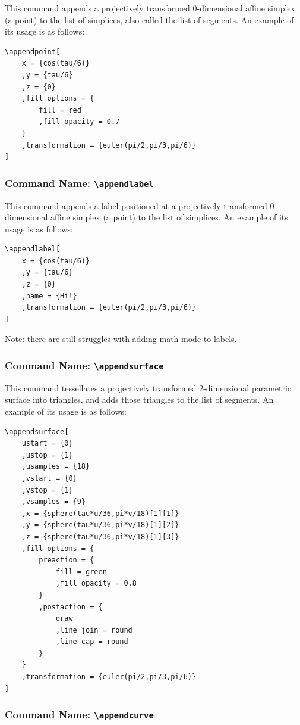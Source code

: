 This command appends a projectively transformed \(0\)-dimensional 
affine simplex (a point) to the list of simplices, also called the 
list of segments. An example of its usage is as follows:
\begin{verbatim}
\appendpoint[
    x = {cos(tau/6)}
    ,y = {tau/6}
    ,z = {0}
    ,fill options = {
        fill = red
        ,fill opacity = 0.7
    }
    ,transformation = {euler(pi/2,pi/3,pi/6)}
]
\end{verbatim}

\subsubsection{Command Name: \texttt{\textbackslash appendlabel}}
This command appends a label positioned at a projectively 
transformed \(0\)-dimensional affine simplex (a point) to the list 
of simplices. An example of its usage is as follows:
\begin{verbatim}
\appendlabel[
    x = {cos(tau/6)}
    ,y = {tau/6}
    ,z = {0}
    ,name = {Hi!}
    ,transformation = {euler(pi/2,pi/3,pi/6)}
]
\end{verbatim}
Note: there are still struggles with adding math mode to labels.

\subsubsection{Command Name: \texttt{\textbackslash appendsurface}}

This command tessellates a projectively transformed \(2\)-dimensional 
parametric surface into triangles, and adds those triangles to the 
list of segments. An example of its usage is as follows:
\begin{verbatim}
\appendsurface[
    ustart = {0}
    ,ustop = {1}
    ,usamples = {18}
    ,vstart = {0}
    ,vstop = {1}
    ,vsamples = {9}
    ,x = {sphere(tau*u/36,pi*v/18)[1][1]}
    ,y = {sphere(tau*u/36,pi*v/18)[1][2]}
    ,z = {sphere(tau*u/36,pi*v/18)[1][3]}
    ,fill options = {
        preaction = {
            fill = green
            ,fill opacity = 0.8
        }
        ,postaction = {
            draw
            ,line join = round
            ,line cap = round
        }
    }
    ,transformation = {euler(pi/2,pi/3,pi/6)}
]
\end{verbatim}

\subsubsection{Command Name: \texttt{\textbackslash appendcurve}}

